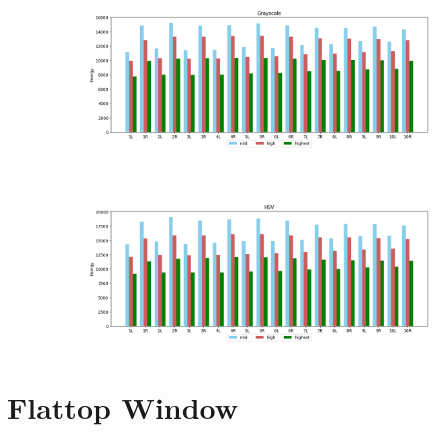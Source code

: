\begin{figure}[H]
    \caption{Coin "v" STFT approach with Hann window for Grayscale (a) and HSV (b) colourspaces.}
    \centering
    \begin{subfigure}{\textwidth}
        \centering
        \includegraphics[scale=0.5]{images/appendix/stft/coin_v/hann_Grayscale.png}
        \caption{}
    \end{subfigure}\\
    \begin{subfigure}{\textwidth}
         \centering
          \includegraphics[scale=0.5]{images/appendix/stft/coin_v/hann_HSV.png}
          \caption{}
    \end{subfigure}
    \fautor
\end{figure}

\section{Flattop Window}

